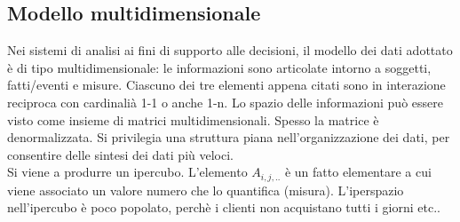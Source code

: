 \subsection{Modello multidimensionale}
\label{sub:Modello multidimensionale}
Nei sistemi di analisi ai fini di supporto alle decisioni, il modello dei dati adottato
\`e di tipo multidimensionale: le informazioni sono articolate intorno a soggetti, fatti/eventi e misure.
Ciascuno dei tre elementi appena citati sono in interazione reciproca con cardinali\`a 1-1 o anche 1-n.
Lo spazio delle informazioni pu\`o essere visto come insieme di matrici multidimensionali.
Spesso la matrice \`e denormalizzata. Si privilegia una struttura piana nell'organizzazione dei dati,
per consentire delle sintesi dei dati pi\`u veloci.\\
Si viene a produrre un ipercubo. L'elemento $A_{i,j,..}$ \`e un fatto elementare a cui viene associato un valore
numero che lo quantifica (misura).
L'iperspazio nell'ipercubo \`e poco popolato, perch\`e i clienti non acquistano tutti i giorni etc..
